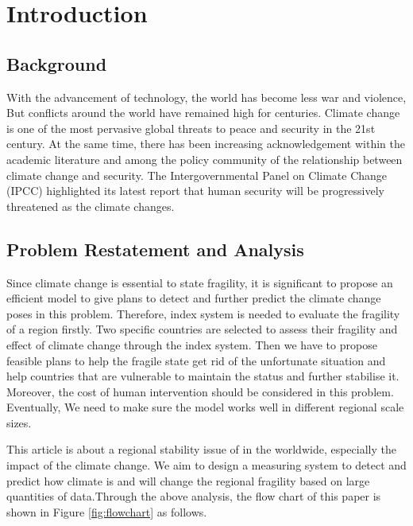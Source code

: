 \documentclass{mcmthesis}
\begin{document}
	\maketitle
	\setcounter{tocdepth}{2}
	\tableofcontents
	
	
	\section{Introduction}
	
		\subsection{Background}
		
			With the advancement of technology, the world has become less war and violence, But conflicts around the world have remained high for centuries. Climate change is one of the most pervasive global threats to peace and security in the 21st century. At the same time, there has been increasing acknowledgement within the academic literature and among the policy community of the relationship between climate change and security. The Intergovernmental Panel on Climate Change (IPCC) highlighted its latest report that human security will be progressively threatened as the climate changes.
	
		\subsection{Problem Restatement and Analysis}
			
			Since climate change is essential to state fragility, it is significant to propose an efficient model to give plans to detect and further predict the climate change poses in this problem. Therefore, index system is needed to evaluate the fragility of a region firstly. Two specific countries are selected to assess their fragility and effect of climate change through the index system. Then we have to propose feasible plans to help the fragile state get rid of the unfortunate situation and help countries that are vulnerable to maintain the status and further stabilise it. Moreover, the cost of human intervention should be considered in this problem. Eventually, We need to make sure the model works well in different regional scale sizes.
			
			This article is about a regional stability issue of in the worldwide, especially the impact of the climate change. We aim to design a measuring system to detect and predict how climate is and will change the regional fragility based on large quantities of data.Through the above analysis, the flow chart of this paper is shown in Figure \ref{fig:flowchart} as follows.
			
\end{document}
